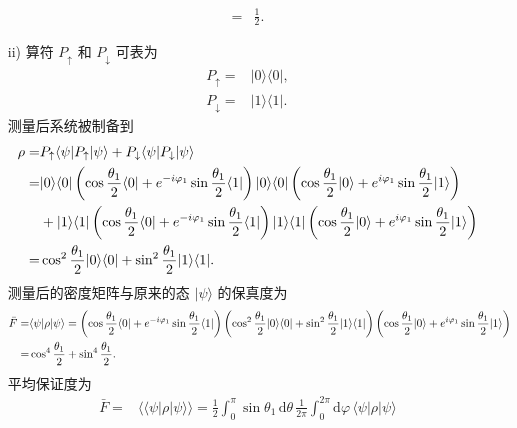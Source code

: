 \documentclass{assignment}
\begin{document}
\begin{sol}
\begin{itemize}
\begin{align}
            =&\frac{1}{2}.
        \end{align}
        \item[ii)] 算符 $P_{\uparrow}$ 和 $P_{\downarrow}$ 可表为
        \begin{align}
            P_{\uparrow}=&\lvert 0\rangle\langle 0\rvert,\\
            P_{\downarrow}=&\lvert 1\rangle\langle 1\rvert.
        \end{align}
        测量后系统被制备到
        \begin{align}
            \notag\rho=&P_{\uparrow}\langle\psi\rvert P_{\uparrow}\rvert\psi\rangle+P_{\downarrow}\langle\psi\rvert P_{\downarrow}\lvert\psi\rangle\\
            \notag=&\lvert 0\rangle\langle 0\rvert\left(\cos\frac{\theta_1}{2}\langle 0\rvert+e^{-i\varphi_1}\sin\frac{\theta_1}{2}\langle 1\rvert\right)\lvert 0\rangle\langle 0\rvert\left(\cos\frac{\theta_1}{2}\lvert 0\rangle+e^{i\varphi_1}\sin\frac{\theta_1}{2}\lvert 1\rangle\right)\\
            \notag&+\lvert 1\rangle\langle 1\rvert\left(\cos\frac{\theta_1}{2}\langle 0\rvert+e^{-i\varphi_1}\sin\frac{\theta_1}{2}\langle 1\rvert\right)\lvert 1\rangle\langle 1\rvert\left(\cos\frac{\theta_1}{2}\lvert 0\rangle+e^{i\varphi_1}\sin\frac{\theta_1}{2}\lvert 1\rangle\right)\\
            =&\cos^2\frac{\theta_1}{2}\lvert 0\rangle\langle 0\rvert+\sin^2\frac{\theta_1}{2}\lvert 1\rangle\langle 1\rvert.
        \end{align}
        测量后的密度矩阵与原来的态 $\lvert\psi\rangle$ 的保真度为
        \begin{align}
            \notag\bar{F}=&\langle\psi\rvert\rho\lvert\psi\rangle=\left(\cos\frac{\theta_1}{2}\langle 0\rvert+e^{-i\varphi_1}\sin\frac{\theta_1}{2}\langle 1\rvert\right)\left(\cos^2\frac{\theta_1}{2}\lvert 0\rangle\langle 0\rvert+\sin^2\frac{\theta_1}{2}\lvert 1\rangle\langle 1\rvert\right)\left(\cos\frac{\theta_1}{2}\lvert 0\rangle+e^{i\varphi_1}\sin\frac{\theta_1}{2}\lvert 1\rangle\right)\\
            =&\cos^4\frac{\theta_1}{2}+\sin^4\frac{\theta_1}{2}.
        \end{align}
        平均保证度为
        \begin{align}
            \bar{F}=&\langle\langle\psi\rvert\rho\lvert\psi\rangle\rangle=\frac{1}{2}\int_0^{\pi}\sin\theta_1\,\mathrm{d}\theta\,\frac{1}{2\pi}\int_0^{2\pi}\mathrm{d}\varphi\,\langle\psi\rvert\rho\lvert\psi\rangle\\

\end{align}
\end{itemize}
\end{sol}
\end{document}
